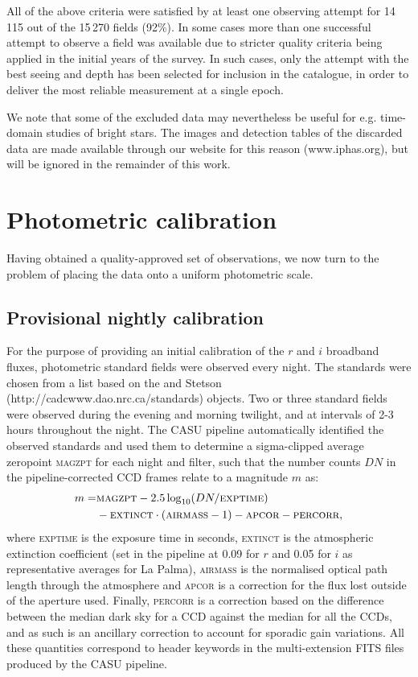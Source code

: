 \documentclass[useAMS,usenatbib]{mn2e}
\begin{document}
All of the above criteria were satisfied by at least one observing attempt
for 14\,115 out of the 15\,270 fields (92\%).
In some cases more than one successful attempt to observe
a field was available due to stricter
quality criteria being applied in the initial years of the survey.
In such cases, only the attempt 
with the best seeing and depth has been selected
for inclusion in the catalogue, in order  
to deliver the most reliable measurement at a single epoch.

We note that some of the excluded data may nevertheless be useful
for e.g. time-domain studies of bright stars.
The images and detection tables of the discarded data are made
available through our website for this reason (www.iphas.org),
but will be ignored in the remainder of this work.

\section{Photometric calibration}
\label{sec:calibration}

Having obtained a quality-approved set of observations,
we now turn to the problem of placing the data
onto a uniform photometric scale.

\subsection{Provisional nightly calibration}

For the purpose of providing an initial calibration 
of the $r$ and $i$ broadband fluxes,
photometric standard fields were observed every night.
The standards were chosen from a list based on 
the \cite{Landolt1992} and Stetson (http://cadcwww.dao.nrc.ca/standards) 
objects.
Two or three standard fields were observed 
during the evening and morning twilight,
and at intervals of 2-3 hours throughout the night.
The CASU pipeline automatically identified the observed standards 
and used them to determine a sigma-clipped average zeropoint \textsc{magzpt}
for each night and filter,
such that the number counts $DN$ 
in the pipeline-corrected CCD frames
relate to a magnitude $m$ as:
\begin{equation}
\begin{split}
   m  = & \textsc{magzpt} - 2.5 \log_{10}( DN / \textsc{exptime} ) \\
 &  - \textsc{extinct}\cdot(\textsc{airmass}-1) - \textsc{apcor} - \textsc{percorr},
\label{eqn:mag}
\end{split}
\end{equation}
where \textsc{exptime} is the exposure time in seconds,
\textsc{extinct} is the atmospheric extinction coefficient 
(set in the pipeline at 0.09 for $r$ and 0.05 for $i$ as representative
averages for La Palma),
\textsc{airmass} is the normalised optical path length 
through the atmosphere and
\textsc{apcor} is a correction for the flux
lost outside of the aperture used.
Finally, \textsc{percorr} is a correction based on the difference
between the median dark sky for a CCD against the median for all the CCDs, 
and as such is an ancillary correction 
to account for sporadic gain variations. 
All these quantities correspond to header keywords in the 
multi-extension FITS files produced by the CASU pipeline.
\end{document}

